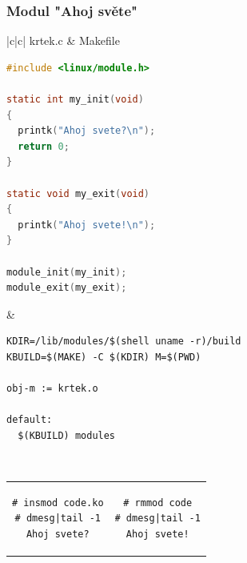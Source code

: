 \documentclass[xcolor=dvipsnames]{beamer}
\begin{document}
\begin{frame}[fragile]
  \frametitle{Modul "Ahoj světe"}
  \begin{center}
  \begin{tabular}{|c|c|} \hline
  krtek.c & Makefile \\ \hline
  \begin{lstlisting}[language=C]
#include <linux/module.h>

static int my_init(void)
{
  printk("Ahoj svete?\n");
  return 0;
}

static void my_exit(void)
{
  printk("Ahoj svete!\n");
}

module_init(my_init);
module_exit(my_exit);
  \end{lstlisting} &
  \begin{lstlisting}[language=XML]
KDIR=/lib/modules/$(shell uname -r)/build
KBUILD=$(MAKE) -C $(KDIR) M=$(PWD)

obj-m := krtek.o

default:
  $(KBUILD) modules
  \end{lstlisting} \\ \hline
  \end{tabular}

  \pause

  \begin{tabular}{|c|c|}
  \begin{lstlisting}[language=XML]
# insmod code.ko
# dmesg|tail -1
Ahoj svete?
  \end{lstlisting} &
  \begin{lstlisting}[language=XML]
# rmmod code
# dmesg|tail -1
Ahoj svete!
  \end{lstlisting}
  \end{tabular}
  \end{center}
\end{frame}
\end{document}
